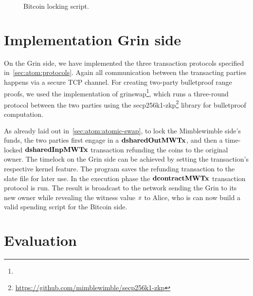 \begin{figure}
    \begin{center}
    \end{center}
    \caption{Bitcoin locking script.}\label{fig:bitcoin-script}
\end{figure}

\section{Implementation Grin side}\label{sec:ImplementationGrin}

On the Grin side, we have implemented the three transaction protocols specified in~\cref{sec:atom:protocols}.
Again all communication between the transacting parties happens via a secure TCP channel.
For creating two-party bulletproof range proofs, we used the implementation of grinswap\footnote{\urlgrnswp}, which runs a three-round protocol between the two parties using the secp256k1-zkp\footnote{\url{https://github.com/mimblewimble/secp256k1-zkp}} library for bulletproof computation.

As already laid out in~\cref{sec:atom:atomic-swap}, to lock the Mimblewimble side's funds, the two parties first engage in a $\mathbf{dsharedOutMWTx}$, and then a time-locked $\mathbf{dsharedInpMWTx}$ transaction refunding the coins to the original owner.
The timelock on the Grin side can be achieved by setting the transaction's respective kernel feature.
The program saves the refunding transaction to the slate file for later use.
In the execution phase the $\mathbf{dcontractMWTx}$ transaction protocol is run.
The result is broadcast to the network sending the Grin to its new owner while revealing the witness value $\mathit{x}$ to Alice, who is can now build a valid spending script for the Bitcoin side.

\section{Evaluation}

